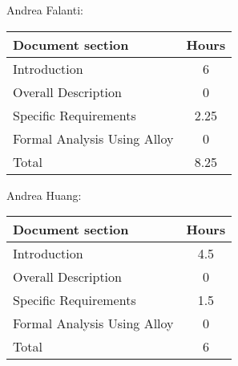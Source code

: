 Andrea Falanti:

\begin{tabular}{|l|c|}
    \hline
    Document section & Hours \\
    \hline
     Introduction & 6\\
     Overall Description & 0\\
     Specific Requirements & 2.25\\
     Formal Analysis Using Alloy & 0\\
     \hline
     Total & 8.25\\
     \hline
\end{tabular}
\vskip 0.3in

Andrea Huang:

\begin{tabular}{|l|c|}
    \hline
    Document section & Hours \\
    \hline
     Introduction &  4.5\\
     Overall Description & 0\\
     Specific Requirements & 1.5\\
     Formal Analysis Using Alloy & 0\\
     \hline
     Total & 6\\
     \hline
\end{tabular}